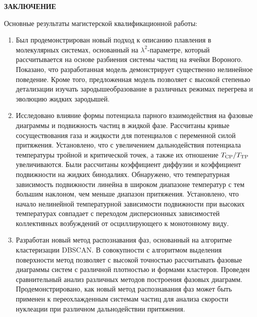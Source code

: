 \newpage
\begin{center}
  \textbf{\large ЗАКЛЮЧЕНИЕ}
\end{center}


Основные результаты магистерской квалификационной работы:
\begin{enumerate}

\item Был продемонстрирован новый подход к описанию плавления в молекулярных системах, основанный на $\lambda^2$-параметре, который рассчитывается на основе разбиения системы частиц на ячейки Вороного.
  Показано, что разработанная модель демонстрирует существенно нелинейное поведение.
  Кроме того, предложенная модель позволяет с высокой степенью детализации изучать зародышеобразование в различных режимах перегрева и эволюцию жидких зародышей.

\item Исследовано влияние формы потенциала парного взаимодействия на фазовые диаграммы и подвижность частиц в жидкой фазе.
  Рассчитаны кривые сосуществования газа и жидкости для потенциалов с переменной силой притяжения. 
  Установлено, что с увеличением дальнодействия потенциала температуры тройной и критической точек, а также их отношение $T_{\rm CP}/T_{\rm TP}$ увеличиваются. 
  Были рассчитаны коэффициент диффузии и коэффициент подвижности на жидких бинодалиях.
  Обнаружено, что температурная зависимость подвижности линейна в широком диапазоне температур с тем большим наклоном, чем меньше диапазон притяжения.
  Установлено, что начало нелинейной температурной зависимости подвижности при высоких температурах совпадает с переходом дисперсионных зависимостей коллективных возбуждений от осциллирующего к монотонному виду.

\item Разработан новый метод распознавания фаз, основанный на алгоритме кластеризации DBSCAN.
  В совокупности с алгоритмом выделения поверхности метод позволяет с высокой точностью рассчитывать фазовые диаграммы систем с различной плотностью и формами кластеров.
  Проведен сравнительный анализ различных методов построения фазовых диаграмм.
  Продемонстрировано, как новый метод распознавания фаз может быть применен к переохлажденным системам частиц для анализа скорости нуклеации при различном дальнодействии притяжения.

\end{enumerate}
